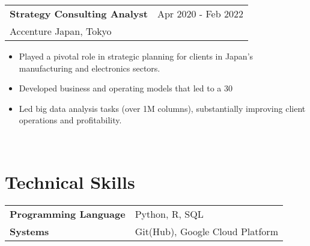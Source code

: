 \documentclass[11pt, a4paper]{article}
\begin{document}
\newpage
\noindent
\begin{tabular}{@{}p{}p{}}
\textbf{Strategy Consulting Analyst} & \hfill Apr 2020 - Feb 2022 \\
Accenture Japan, Tokyo \\
\end{tabular}
\begin{itemize}[noitemsep, topsep=0pt] %
    \item Played a pivotal role in strategic planning for clients in Japan's manufacturing and electronics sectors.
    \item Developed business and operating models that led to a 30%
    \item Led big data analysis tasks (over 1M columns), substantially improving client operations and profitability.
\end{itemize} \\

\section*{Technical Skills}
\begin{tabular}{@{}p{}p{}}
\textbf{Programming Language} & Python, R, SQL \\
\textbf{Systems} & Git(Hub), Google Cloud Platform \\
\end{tabular}
\end{document}
